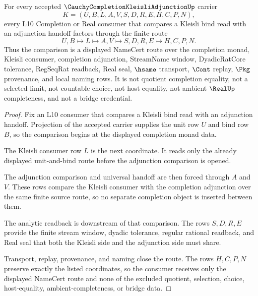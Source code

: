 \begin{theorem}
\label{thm:cauchy-completion-kleisli-adjunction-route}
For every accepted $\CauchyCompletionKleisliAdjunctionUp$ carrier
$$
K=(U,B,L,A,V,S,D,R,E,H,C,P,N),
$$
every L10 Completion or Real consumer that compares a Kleisli bind read with an adjunction handoff factors through the finite route
$$
U,B \longmapsto L \longmapsto A,V \longmapsto S,D,R,E \longmapsto H,C,P,N .
$$
Thus the comparison is a displayed NameCert route over the completion monad, Kleisli consumer, completion adjunction, StreamName window, DyadicRatCore tolerance, RegSeqRat readback, Real seal, $\hsame$ transport, $\Cont$ replay, $\Pkg$ provenance, and local naming rows. It is not quotient completion equality, not a selected limit, not countable choice, not host equality, not ambient $\RealUp$ completeness, and not a bridge credential.
\end{theorem}
\begin{proof}
Fix an L10 consumer that compares a Kleisli bind read with an adjunction handoff. Projection of the accepted carrier supplies the unit row $U$ and bind row $B$, so the comparison begins at the displayed completion monad data.

The Kleisli consumer row $L$ is the next coordinate. It reads only the already displayed unit-and-bind route before the adjunction comparison is opened.

The adjunction comparison and universal handoff are then forced through $A$ and $V$. These rows compare the Kleisli consumer with the completion adjunction over the same finite source route, so no separate completion object is inserted between them.

The analytic readback is downstream of that comparison. The rows $S,D,R,E$ provide the finite stream window, dyadic tolerance, regular rational readback, and Real seal that both the Kleisli side and the adjunction side must share.

Transport, replay, provenance, and naming close the route. The rows $H,C,P,N$ preserve exactly the listed coordinates, so the consumer receives only the displayed NameCert route and none of the excluded quotient, selection, choice, host-equality, ambient-completeness, or bridge data.
\end{proof}

